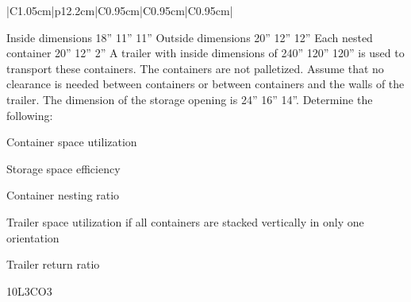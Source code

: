 \documentclass{rvcepaper}
\begin{document}
\begin{iempaperB}
\begin{longtable}{|C{1.05cm}|p{12.2cm}|C{0.95cm}|C{0.95cm}|C{0.95cm}|}
{Inside dimensions 18'' 11'' 11''\newline
Outside dimensions 20'' 12'' 12''\newline
Each nested container 20'' 12'' 2''\newline
A trailer with inside dimensions of 240'' 120'' 120'' is used to transport these containers. The containers are not palletized. Assume that no clearance is needed between containers or between containers and the walls of the trailer. The dimension of the storage opening is 24'' 16'' 14''. Determine the following:
\begin{romi}\item Container space utilization\item Storage space efficiency\item Container nesting ratio\item Trailer space utilization if all containers are stacked vertically in only one orientation\item Trailer return ratio\end{romi}}{10}{L3}{CO3}
\end{longtable}
\stars{*******}
\end{iempaperB}
\end{document}
